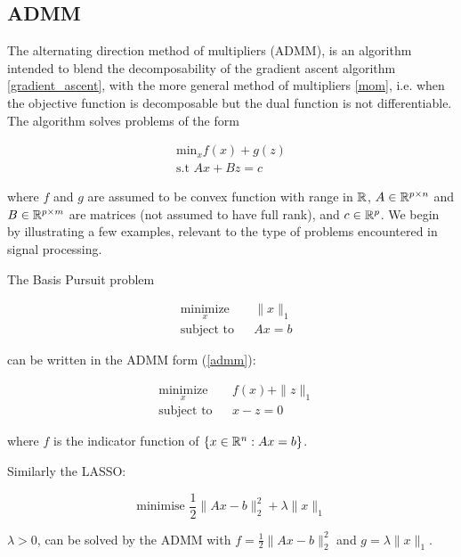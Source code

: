 \subsection{ADMM}
The alternating direction method of multipliers (ADMM), is an algorithm intended to blend the decomposability of the gradient ascent algorithm \ref{gradient_ascent}, with the more general method of multipliers \ref{mom}, i.e. when the objective function is decomposable but the dual function is not differentiable. The algorithm solves problems of the form

\begin{align}
\text{min}_{x} f\left( x \right) + g\left(z\right)
\\
\text{s.t } Ax +Bz = c
\label{admm}
\end{align}

where \(f\) and \(g\) are assumed to be convex function with range in \({\mathbb{R}}\), \(A \in {\mathbb{R}}^{p \times n}\) and \(B\in {\mathbb{R}}^{p \times m}\) are matrices (not assumed to have full rank), and \(c \in {\mathbb{R}}^p\). We begin by illustrating a few examples, relevant to the type of problems encountered in signal processing.

\begin{example}
The Basis Pursuit problem

\begin{equation*}
\begin{aligned}
& \underset{x}{\text{minimize}}
& & \|x\|_1 \\
& \text{subject to}
& & Ax = b
\label{bp}
\end{aligned}
\end{equation*}

can be written in the ADMM form (\ref{admm}):

\begin{equation*}
\begin{aligned}
& \underset{x}{\text{minimize}}
& & f\left( x \right) + \|z\|_1 \\
& \text{subject to}
& & x - z = 0
\label{bp_reform}
\end{aligned}
\end{equation*}

where \(f\) is the indicator function of \(\{x\in {\mathbb{R}}^n : Ax = b\}\). 

\end{example} 

\begin{example}
Similarly the LASSO:

\begin{equation}
\text{minimise } \frac{1}{2}\|Ax-b\|_2^2 + \lambda\|x\|_1
\end{equation}

\(\lambda > 0\), can be solved by the ADMM with \(f = \frac{1}{2}\|Ax-b\|_2^2\) and \(g = \lambda\|x\|_1\).

\end{example}

